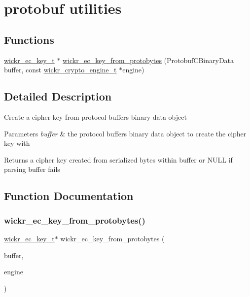 \hypertarget{group__protobuf__utils}{}\section{protobuf utilities}
\label{group__protobuf__utils}
\subsection*{Functions}
\begin{DoxyCompactItemize}
\item 
\hyperlink{structwickr__ec__key}{wickr\+\_\+ec\+\_\+key\+\_\+t} $\ast$ \hyperlink{group__protobuf__utils_gae6d8cb6ff807fbff046065555bbece2e}{wickr\+\_\+ec\+\_\+key\+\_\+from\+\_\+protobytes} (Protobuf\+C\+Binary\+Data buffer, const \hyperlink{structwickr__crypto__engine}{wickr\+\_\+crypto\+\_\+engine\+\_\+t} $\ast$engine)
\end{DoxyCompactItemize}


\subsection{Detailed Description}
Create a cipher key from protocol buffers binary data object


\begin{DoxyParams}{Parameters}
{\em buffer} & the protocol buffers binary data object to create the cipher key with \\
\hline
\end{DoxyParams}
\begin{DoxyReturn}{Returns}
a cipher key created from serialized bytes within \textquotesingle{}buffer\textquotesingle{} or N\+U\+LL if parsing buffer fails 
\end{DoxyReturn}


\subsection{Function Documentation}
\mbox{\label{group__protobuf__utils_gae6d8cb6ff807fbff046065555bbece2e}} 
\subsubsection{\texorpdfstring{wickr\+\_\+ec\+\_\+key\+\_\+from\+\_\+protobytes()}{wickr\_ec\_key\_from\_protobytes()}}
{\footnotesize\ttfamily \hyperlink{structwickr__ec__key}{wickr\+\_\+ec\+\_\+key\+\_\+t}$\ast$ wickr\+\_\+ec\+\_\+key\+\_\+from\+\_\+protobytes (\begin{DoxyParamCaption}\item[{Protobuf\+C\+Binary\+Data}]{buffer,  }\item[{const \hyperlink{structwickr__crypto__engine}{wickr\+\_\+crypto\+\_\+engine\+\_\+t} $\ast$}]{engine }\end{DoxyParamCaption})}

